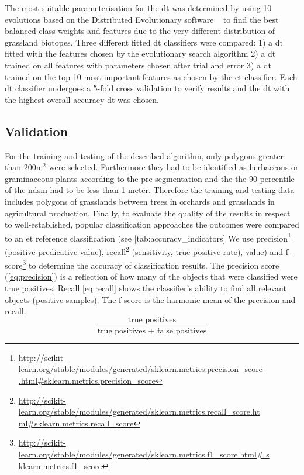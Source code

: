 \documentclass[authoryear,review,12pt,number]{elsarticle}
\begin{document}

The most suitable parameterisation for the \gls{dt} was determined by using 10
evolutions based on the Distributed Evolutionary software ~\citep{DEAP_JMLR2012}
to find the best balanced class
 weights and features due to the very different distribution of grassland
 biotopes.%
 Three different fitted \gls{dt} classifiers were
compared: 1) a \gls{dt} fitted with the features chosen by the evolutionary
search algorithm 2) a \gls{dt} trained on all features with parameters chosen
after trial and error 3) a \gls{dt} trained on the top 10 most important
features as chosen by the \gls{et} classifier. Each \gls{dt} classifier
undergoes a 5-fold cross validation to verify results and the \gls{dt} with the
highest overall accuracy \gls{dt} was chosen.
\label{subsec:rulegen_data_mining}

\subsection{Validation} 
\label{subsec:Validation}
For the training and testing of the described algorithm, only polygons greater
than 200m$^{2}$ were selected. Furthermore they had to be identified as
herbaceous or graminaceous plants according to the pre-segmentation and the 
the 90 percentile of the \gls{ndsm} had to be less than 1 meter. Therefore the
training and testing data includes polygons of grasslands between trees in
orchards and grasslands in agricultural production. Finally, to evaluate the
quality of the results in respect to well-established, popular classification
approaches the outcomes were compared to an \gls{et} reference classification
(see
\ref{tab:accuracy_indicators}
We use precision\footnote{\url{
http://scikit-learn.org/stable/modules/generated/sklearn.metrics.precision_score
.html\#sklearn.metrics.precision\_score}} (positive predicative value), 
recall\footnote{\url{
http://scikit-learn.org/stable/modules/generated/sklearn.metrics.recall_score.ht
ml\#sklearn.metrics.recall\_score}} (sensitivity, true positive rate), 
value) and 
f-score\footnote{\url{
http://scikit-learn.org/stable/modules/generated/sklearn.metrics.f1_score.html\#
s
klearn.metrics.f1\_score}} to determine the accuracy of classification results. 
The precision score (\ref{eq:precision}) is a reflection of how many of the 
objects that were classified were true positives. Recall \ref{eq:recall} shows 
the classifier's ability to find all relevant objects (positive samples). The 
f-score is the harmonic mean of the precision and recall.
\begin{equation}\label{eq:precision}
    \frac{\text{true positives}}{\text{true positives + false positives}}
\end{equation}
\end{document}
